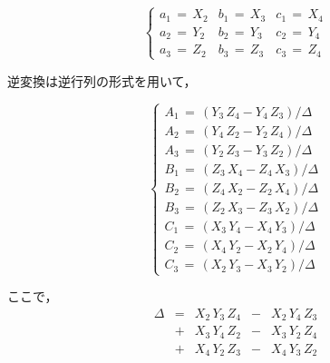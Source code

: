 \begin{equation}
\left\{
\begin{array}{lll}
a_1 \,=\, X_2 & b_1 \,=\, X_3 & c_1 \,=\, X_4\\
a_2 \,=\, Y_2 & b_2 \,=\, Y_3 & c_2 \,=\, Y_4\\
a_3 \,=\, Z_2 & b_3 \,=\, Z_3 & c_3 \,=\, Z_4
\end{array}
\right.
\label{eq:coef-before}
\end{equation}

逆変換は逆行列の形式を用いて，

\begin{equation}
\left\{
\begin{array}{lll}
A_1 \,=\, (Y_3\,Z_4 - Y_4\,Z_3)/\Delta\\
A_2 \,=\, (Y_4\,Z_2 - Y_2\,Z_4)/\Delta\\
A_3 \,=\, (Y_2\,Z_3 - Y_3\,Z_2)/\Delta\\
B_1 \,=\, (Z_3\,X_4 - Z_4\,X_3)/\Delta\\
B_2 \,=\, (Z_4\,X_2 - Z_2\,X_4)/\Delta\\
B_3 \,=\, (Z_2\,X_3 - Z_3\,X_2)/\Delta\\
C_1 \,=\, (X_3\,Y_4 - X_4\,Y_3)/\Delta\\
C_2 \,=\, (X_4\,Y_2 - X_2\,Y_4)/\Delta\\
C_3 \,=\, (X_2\,Y_3 - X_3\,Y_2)/\Delta
\end{array}
\right.
\label{eq:coef-after}
\end{equation}

ここで，
\[
\begin{array}{lllll}
\Delta & = & X_2\,Y_3\,Z_4 & - & X_2\,Y_4\,Z_3 \\
       & + & X_3\,Y_4\,Z_2 & - & X_3\,Y_2\,Z_4 \\
       & + & X_4\,Y_2\,Z_3 & - & X_4\,Y_3\,Z_2 \\
\end{array}
\]
